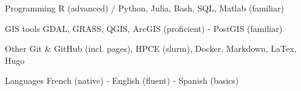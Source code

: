 \vspace{-20pt}


\begin{cvskills}

  \cvskill
    {Programming} %
    {R (advanced) / Python, Julia, Bash, SQL, Matlab (familiar)} %

  \cvskill
    {GIS tools} %
    {GDAL, GRASS, QGIS, ArcGIS (proficient) - PostGIS (familiar)} %

  \cvskill
    {Other} %
    {Git \& GitHub (incl. pages), HPCE (slurm), Docker, Markdown, LaTex, Hugo} %

  \cvskill
    {Languages} %
    {French (native) - English (fluent) - Spanish (basics)} %

\end{cvskills}
